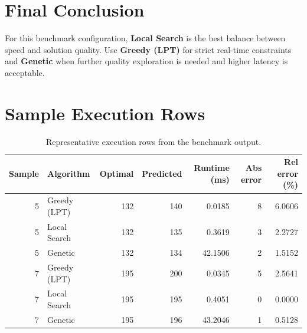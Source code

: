 \documentclass[11pt]{article}
\begin{document}
\section{Final Conclusion}
For this benchmark configuration, \textbf{Local Search} is the best balance between speed and solution quality.
Use \textbf{Greedy (LPT)} for strict real-time constraints and \textbf{Genetic} when further quality exploration is needed and higher latency is acceptable.

\appendix
\section{Sample Execution Rows}
\begin{table}[H]
\centering
\scriptsize
\begin{tabular}{r l r r r r r}
\toprule
Sample & Algorithm & Optimal & Predicted & Runtime (ms) & Abs error & Rel error (\%) \\
\midrule
5  & Greedy (LPT) & 132 & 140 & 0.0185 & 8  & 6.0606 \\
5  & Local Search & 132 & 135 & 0.3619 & 3  & 2.2727 \\
5  & Genetic & 132 & 134 & 42.1506 & 2 & 1.5152 \\
7  & Greedy (LPT) & 195 & 200 & 0.0345 & 5  & 2.5641 \\
7  & Local Search & 195 & 195 & 0.4051 & 0  & 0.0000 \\
7  & Genetic & 195 & 196 & 43.2046 & 1 & 0.5128 \\
\bottomrule
\end{tabular}
\caption{Representative execution rows from the benchmark output.}
\end{table}
\end{document}

